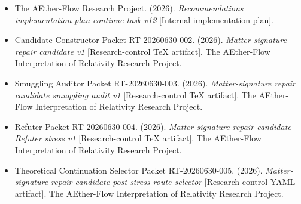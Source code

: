 \documentclass[11pt]{article}
\begin{document}
\begin{itemize}
  \item The AEther-Flow Research Project. (2026). \emph{Recommendations
  implementation plan continue task v12} [Internal implementation plan].
  \item Candidate Constructor Packet RT-20260630-002. (2026).
  \emph{Matter-signature repair candidate v1} [Research-control TeX artifact].
  The AEther-Flow Interpretation of Relativity Research Project.
  \item Smuggling Auditor Packet RT-20260630-003. (2026).
  \emph{Matter-signature repair candidate smuggling audit v1}
  [Research-control TeX artifact]. The AEther-Flow Interpretation of
  Relativity Research Project.
  \item Refuter Packet RT-20260630-004. (2026). \emph{Matter-signature repair
  candidate Refuter stress v1} [Research-control TeX artifact]. The
  AEther-Flow Interpretation of Relativity Research Project.
  \item Theoretical Continuation Selector Packet RT-20260630-005. (2026).
  \emph{Matter-signature repair candidate post-stress route selector}
  [Research-control YAML artifact]. The AEther-Flow Interpretation of
  Relativity Research Project.
\end{itemize}
\end{document}
